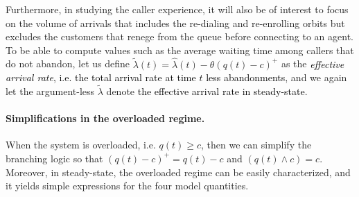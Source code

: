 \documentclass[manuscript,screen,authorversion]{acmart}
\newcommand{\rev}[1]{\textcolor{black}{#1}}
\newcommand{\tr}{\textcolor{red}}
\begin{document}
Furthermore, in studying the caller experience, it will also be of interest to focus on the volume of arrivals that includes the re-dialing and re-enrolling orbits but excludes the customers that renege from the queue before connecting to an agent. To be able to compute values such as the average waiting time among callers that do not abandon, let us define $\tilde{\lambda}(t) = \hat\lambda(t) - \theta(q(t) - c)^+$ as the \rev{\emph{effective arrival rate}, i.e. the total arrival rate at time $t$ less abandonments}, and we again let the argument-less $\tilde \lambda$ denote \rev{the effective arrival rate in steady-state}.


\paragraph{Simplifications in the overloaded regime.} When the system is overloaded, i.e. $q(t) \geq c$, then we can simplify the branching logic so that $(q(t) - c)^+ = q(t) -c$ and $(q(t) \wedge c)=c$. Moreover, in  steady-state, the overloaded regime can be easily characterized, and it yields simple expressions for the four model quantities.




\end{document}
